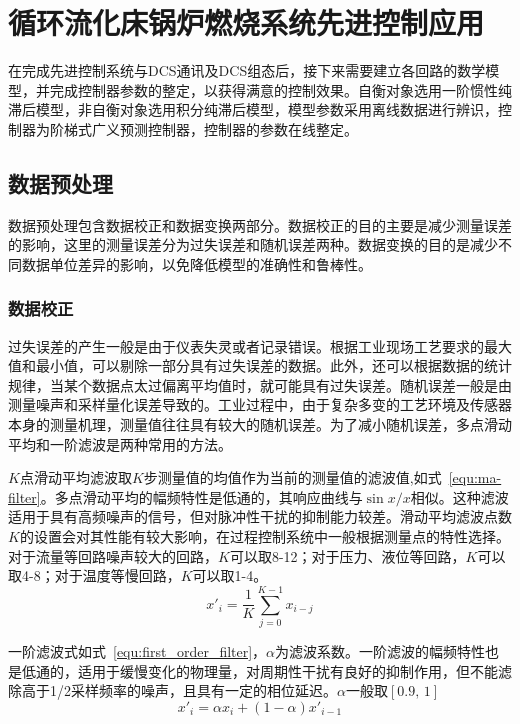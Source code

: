\chapter{循环流化床锅炉燃烧系统先进控制应用}
\label{chap:application}
在完成先进控制系统与DCS通讯及DCS组态后，接下来需要建立各回路的数学模型，并完成控制器参数的整定，以获得满意的控制效果。自衡对象选用一阶惯性纯滞后模型，非自衡对象选用积分纯滞后模型，模型参数采用离线数据进行辨识，控制器为阶梯式广义预测控制器，控制器的参数在线整定。

\section{数据预处理}
\label{sec:pre_cal}
数据预处理包含数据校正和数据变换两部分。数据校正的目的主要是减少测量误差的影响，这里的测量误差分为过失误差和随机误差两种。数据变换的目的是减少不同数据单位差异的影响，以免降低模型的准确性和鲁棒性。

\subsection{数据校正}
过失误差的产生一般是由于仪表失灵或者记录错误。根据工业现场工艺要求的最大值和最小值，可以剔除一部分具有过失误差的数据。此外，还可以根据数据的统计规律，当某个数据点太过偏离平均值时，就可能具有过失误差。随机误差一般是由测量噪声和采样量化误差导致的。工业过程中，由于复杂多变的工艺环境及传感器本身的测量机理，测量值往往具有较大的随机误差。为了减小随机误差，多点滑动平均和一阶滤波是两种常用的方法。

$K$点滑动平均滤波取$K$步测量值的均值作为当前的测量值的滤波值,如式~\ref{equ:ma-filter}。多点滑动平均的幅频特性是低通的，其响应曲线与$\sin{x}/x$相似。这种滤波适用于具有高频噪声的信号，但对脉冲性干扰的抑制能力较差。滑动平均滤波点数$K$的设置会对其性能有较大影响，在过程控制系统中一般根据测量点的特性选择。对于流量等回路噪声较大的回路，$K$可以取8-12；对于压力、液位等回路，$K$可以取4-8；对于温度等慢回路，$K$可以取1-4。
\begin{equation}
\label{equ:ma-filter}
{x'}_{i}=\frac{1}{K}\sum_{j=0}^{K-1}{x_{i-j}}
\end{equation}


一阶滤波式如式~\ref{equ:first_order_filter}，$\alpha$为滤波系数。一阶滤波的幅频特性也是低通的，适用于缓慢变化的物理量，对周期性干扰有良好的抑制作用，但不能滤除高于1/2采样频率的噪声，且具有一定的相位延迟。$\alpha$一般取$[0.9,\,1]$
\begin{equation}
\label{equ:first_order_filter}
{{x}'_{i}}=\alpha {x_{i}} + (1-\alpha){{x'}_{i-1}}
\end{equation}

